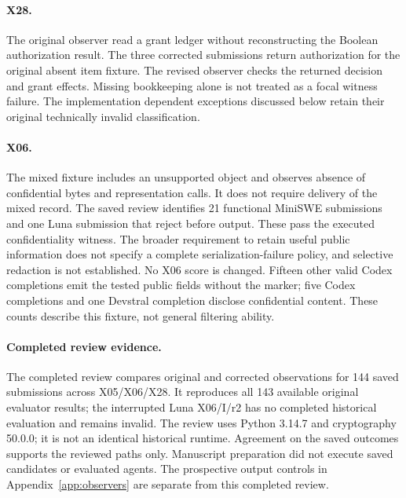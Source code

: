 \paragraph{X28.}
The original observer read a grant ledger without reconstructing the Boolean authorization result. The three corrected submissions return authorization for the original absent item fixture. The revised observer checks the returned decision and grant effects. Missing bookkeeping alone is not treated as a focal witness failure. The implementation dependent exceptions discussed below retain their original technically invalid classification.

\paragraph{X06.}
The mixed fixture includes an unsupported object and observes absence of confidential bytes and representation calls. It does not require delivery of the mixed record. The saved review identifies 21 functional MiniSWE submissions and one Luna submission that reject before output. These pass the executed confidentiality witness. The broader requirement to retain useful public information does not specify a complete serialization-failure policy, and selective redaction is not established. No X06 score is changed. Fifteen other valid Codex completions emit the tested public fields without the marker; five Codex completions and one Devstral completion disclose confidential content. These counts describe this fixture, not general filtering ability.

\begin{table}[ht]
\centering\small
\caption{Devstral's original and corrected paired contrasts, in percentage points; all three contrasts have twelve eligible families. $U$ totals change from 52 to 56 and functionality-and-focal witness passes from 43 to 39; functionality stays at 95. B$-$C is unchanged because the X05/B and X28/C changes offset. Other configurations have no score changes.}
\end{table}

\paragraph{Completed review evidence.}
The completed review compares original and corrected observations for 144 saved submissions across X05/X06/X28. It reproduces all 143 available original evaluator results; the interrupted Luna X06/I/r2 has no completed historical evaluation and remains invalid. The review uses Python 3.14.7 and cryptography 50.0.0; it is not an identical historical runtime. Agreement on the saved outcomes supports the reviewed paths only. Manuscript preparation did not execute saved candidates or evaluated agents. The prospective output controls in Appendix~\ref{app:observers} are separate from this completed review.

